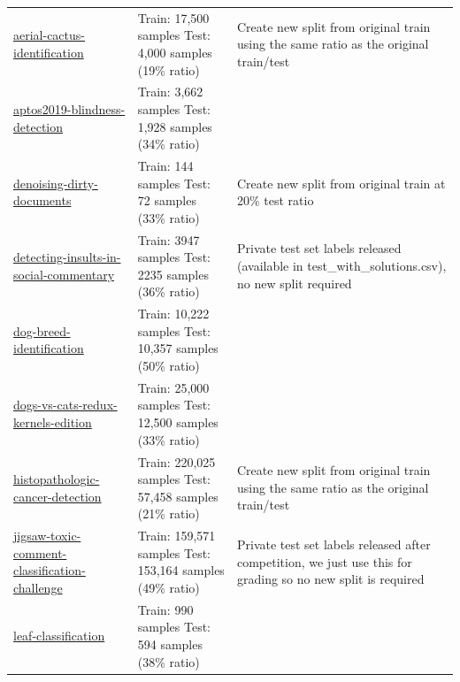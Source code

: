 \documentclass{article} %
\begin{document}
\begin{longtable}{m{4cm} m{4.5cm} m{4cm}}
    \href{https://www.kaggle.com/c/aerial-cactus-identification}{aerial-cactus-identification} &  Train: 17,500 samples \newline  Test: 4,000 samples (19\% ratio) & Create new split from original train using the same ratio as the original train/test \\
    \href{https://www.kaggle.com/c/aptos2019-blindness-detection}{aptos2019-blindness-detection} &  Train: 3,662 samples \newline  Test: 1,928 samples (34\% ratio) & \\
    \href{https://www.kaggle.com/c/denoising-dirty-documents}{denoising-dirty-documents} &  Train: 144 samples \newline  Test: 72 samples (33\% ratio) & Create new split from original train at 20\% test ratio \\
    \href{https://www.kaggle.com/c/detecting-insults-in-social-commentary}{detecting-insults-in-social-commentary} &  Train: 3947 samples \newline  Test: 2235 samples (36\% ratio) & Private test set labels released (available in test\_with\_solutions.csv), no new split required \\
    \href{https://www.kaggle.com/c/dog-breed-identification}{dog-breed-identification} &  Train: 10,222 samples \newline  Test: 10,357 samples (50\% ratio) & \\
    \href{https://www.kaggle.com/c/dogs-vs-cats-redux-kernels-edition}{dogs-vs-cats-redux-kernels-edition} &  Train: 25,000 samples \newline  Test: 12,500 samples (33\% ratio) & \\
    \href{https://www.kaggle.com/c/histopathologic-cancer-detection}{histopathologic-cancer-detection} &  Train: 220,025 samples \newline  Test: 57,458 samples (21\% ratio) & Create new split from original train using the same ratio as the original train/test \\
    \href{https://www.kaggle.com/c/jigsaw-toxic-comment-classification-challenge}{jigsaw-toxic-comment-classification-challenge} &  Train: 159,571 samples \newline  Test: 153,164 samples (49\% ratio) & Private test set labels released after competition, we just use this for grading so no new split is required \\
    \href{https://www.kaggle.com/c/leaf-classification}{leaf-classification} &  Train: 990 samples \newline  Test: 594 samples (38\% ratio) & \\

\end{longtable}
\end{document}
